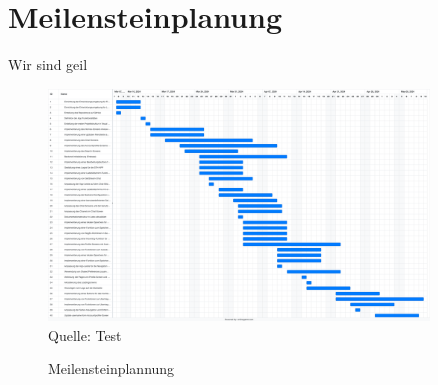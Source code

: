 \chapter{Meilensteinplanung}
Wir sind geil
\begin{figure}[H]
    \caption[Meilensteinplannung]{Meilensteinplannung}
    \includegraphics[width=0.9\textwidth]{assets/figures/STH GANTT Diagramm.png}
    \\
    Quelle: Test
\end{figure}